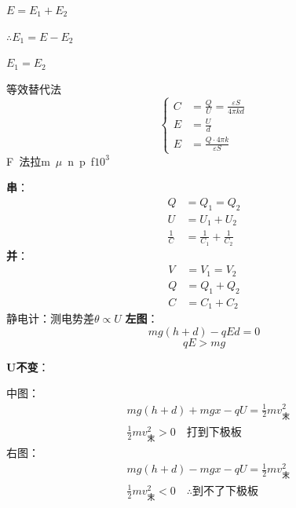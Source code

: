 $E=E_1+E_2$

$\therefore E_1=E-E_2$

$E_1=E_2$

等效替代法
\[
\left\{\begin{aligned}
C&=\frac{Q}{U}=\frac{\varepsilon S}{4\pi kd}\\
E&=\frac{U}{d}\\
E&=\frac{Q\cdot 4\pi k}{\varepsilon S}
\end{aligned}\right.
\]
F\ 法拉\qquad m\ $\mu$\ n\ p\ f\qquad \textcircled{\scriptsize$10^3$}
\begin{minipage}[t]{0.48\linewidth}
\end{minipage}\hfill
\begin{minipage}[t]{0.48\linewidth}
\end{minipage}

\textbf{串}：
\begin{align*}
Q&=Q_1=Q_2\\
U&=U_1+U_2\\
\frac{1}{C}&=\frac{1}{C_1}+\frac{1}{C_2}
\end{align*}
\textbf{并}：
\begin{align*}
V&=V_1=V_2 %
\\
Q&=Q_1+Q_2\\
C&=C_1+C_2
\end{align*}
静电计：测电势差\quad $\theta\propto U$
\textbf{左图}：
\[
mg(h+d)-qEd=0
\]
\[
qE>mg
\]

\textbf{U不变}：

中图：
\begin{align*}
&mg(h+d)+mgx-qU=\tfrac{1}{2}mv_{\text{末}}^2\\
&\tfrac{1}{2}mv_{\text{末}}^2>0\quad\text{打到下极板}
\end{align*}
右图：
\begin{align*}
&mg(h+d)-mgx-qU=\tfrac{1}{2}mv_{\text{末}}^2\\
&\tfrac{1}{2}mv_{\text{末}}^2<0\quad\therefore\text{到不了下极板}
\end{align*}

